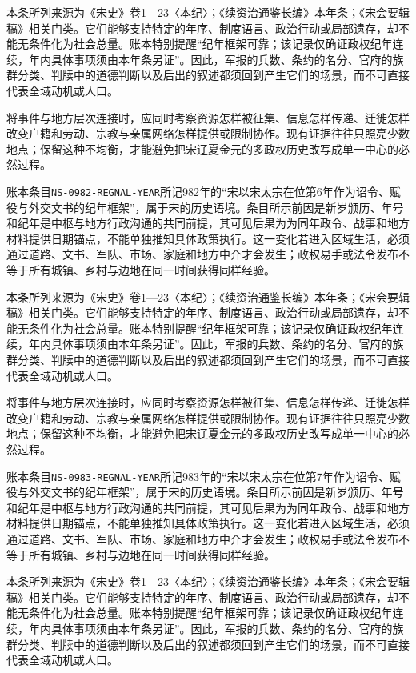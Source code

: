 本条所列来源为《宋史》卷1—23〈本纪〉；《续资治通鉴长编》本年条；《宋会要辑稿》相关门类。它们能够支持特定的年序、制度语言、政治行动或局部遗存，却不能无条件化为社会总量。账本特别提醒“纪年框架可靠；该记录仅确证政权纪年连续，年内具体事项须由本年条另证”。因此，军报的兵数、条约的名分、官府的族群分类、判牍中的道德判断以及后出的叙述都须回到产生它们的场景，而不可直接代表全域动机或人口。

将事件与地方层次连接时，应同时考察资源怎样被征集、信息怎样传递、迁徙怎样改变户籍和劳动、宗教与亲属网络怎样提供或限制协作。现有证据往往只照亮少数地点；保留这种不均衡，才能避免把宋辽夏金元的多政权历史改写成单一中心的必然过程。

账本条目\texttt{NS-0982-REGNAL-YEAR}所记982年的“宋以宋太宗在位第6年作为诏令、赋役与外交文书的纪年框架”，属于宋的历史语境。条目所示前因是新岁颁历、年号和纪年是中枢与地方行政沟通的共同前提，其可见后果为为同年政令、战事和地方材料提供日期锚点，不能单独推知具体政策执行。这一变化若进入区域生活，必须通过道路、文书、军队、市场、家庭和地方中介才会发生；政权易手或法令发布不等于所有城镇、乡村与边地在同一时间获得同样经验。

本条所列来源为《宋史》卷1—23〈本纪〉；《续资治通鉴长编》本年条；《宋会要辑稿》相关门类。它们能够支持特定的年序、制度语言、政治行动或局部遗存，却不能无条件化为社会总量。账本特别提醒“纪年框架可靠；该记录仅确证政权纪年连续，年内具体事项须由本年条另证”。因此，军报的兵数、条约的名分、官府的族群分类、判牍中的道德判断以及后出的叙述都须回到产生它们的场景，而不可直接代表全域动机或人口。

将事件与地方层次连接时，应同时考察资源怎样被征集、信息怎样传递、迁徙怎样改变户籍和劳动、宗教与亲属网络怎样提供或限制协作。现有证据往往只照亮少数地点；保留这种不均衡，才能避免把宋辽夏金元的多政权历史改写成单一中心的必然过程。

账本条目\texttt{NS-0983-REGNAL-YEAR}所记983年的“宋以宋太宗在位第7年作为诏令、赋役与外交文书的纪年框架”，属于宋的历史语境。条目所示前因是新岁颁历、年号和纪年是中枢与地方行政沟通的共同前提，其可见后果为为同年政令、战事和地方材料提供日期锚点，不能单独推知具体政策执行。这一变化若进入区域生活，必须通过道路、文书、军队、市场、家庭和地方中介才会发生；政权易手或法令发布不等于所有城镇、乡村与边地在同一时间获得同样经验。

本条所列来源为《宋史》卷1—23〈本纪〉；《续资治通鉴长编》本年条；《宋会要辑稿》相关门类。它们能够支持特定的年序、制度语言、政治行动或局部遗存，却不能无条件化为社会总量。账本特别提醒“纪年框架可靠；该记录仅确证政权纪年连续，年内具体事项须由本年条另证”。因此，军报的兵数、条约的名分、官府的族群分类、判牍中的道德判断以及后出的叙述都须回到产生它们的场景，而不可直接代表全域动机或人口。

